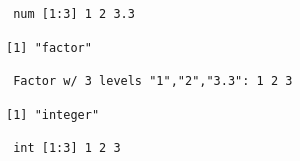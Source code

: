 \begin{verbatim}
 num [1:3] 1 2 3.3
\end{verbatim}

\begin{Shaded}
\begin{Highlighting}[]
\StringTok{ }
\end{Highlighting}
\end{Shaded}

\begin{verbatim}
[1] "factor"
\end{verbatim}

\begin{Shaded}
\begin{Highlighting}[]
\end{Highlighting}
\end{Shaded}

\begin{verbatim}
 Factor w/ 3 levels "1","2","3.3": 1 2 3
\end{verbatim}

\begin{Shaded}
\begin{Highlighting}[]
\StringTok{ }
\end{Highlighting}
\end{Shaded}

\begin{verbatim}
[1] "integer"
\end{verbatim}

\begin{Shaded}
\begin{Highlighting}[]
\end{Highlighting}
\end{Shaded}

\begin{verbatim}
 int [1:3] 1 2 3
\end{verbatim}

\begin{Shaded}
\begin{Highlighting}[]
\StringTok{ }
\end{Highlighting}
\end{Shaded}

